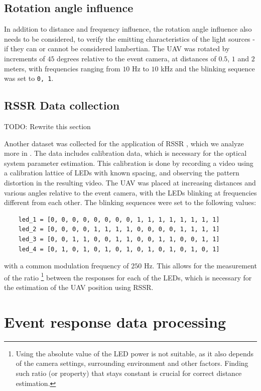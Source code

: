 \subsection{Rotation angle influence}

In addition to distance and frequency influence, the rotation angle influence also needs to be considered, to
verify the emitting characteristics of the light sources - if they can or cannot be considered lambertian.
The UAV was rotated by increments of $45$ degrees relative to the event camera, at distances of $0.5$, $1$ and $2$ meters,
with frequencies ranging from $10$ Hz to $10$ kHz and the blinking sequence was set to \texttt{0, 1}.

\subsection{RSSR Data collection}

TODO: Rewrite this section

Another dataset was collected for the application of \ac{RSSR} \cite{sooyongrssr}, which we analyze more in .
The data includes calibration data, which is necessary for the optical system parameter estimation. This calibration is done by
recording a video using a calibration lattice of LEDs with known spacing, and observing the pattern distortion in the
resulting video.
The UAV was placed at increasing distances and various angles relative to the event camera, with the LEDs blinking at frequencies different from
each other. 
The blinking sequences were set to the following values:
\begin{lstlisting}
	led_1 = [0, 0, 0, 0, 0, 0, 0, 0, 1, 1, 1, 1, 1, 1, 1, 1]
	led_2 = [0, 0, 0, 0, 1, 1, 1, 1, 0, 0, 0, 0, 1, 1, 1, 1]
	led_3 = [0, 0, 1, 1, 0, 0, 1, 1, 0, 0, 1, 1, 0, 0, 1, 1]
	led_4 = [0, 1, 0, 1, 0, 1, 0, 1, 0, 1, 0, 1, 0, 1, 0, 1]
\end{lstlisting}
with a common modulation frequency of $250$ Hz.
This allows for the measurement of the ratio
\footnote{Using the absolute value of the LED power is not suitable, as it also depends of the camera settings, surrounding
environment and other factors. Finding such ratio (or property) that stays constant is crucial for correct distance estimation.}
between the responses for each of the LEDs, which is necessary
for the estimation of the UAV position using RSSR.

\section{Event response data processing}

